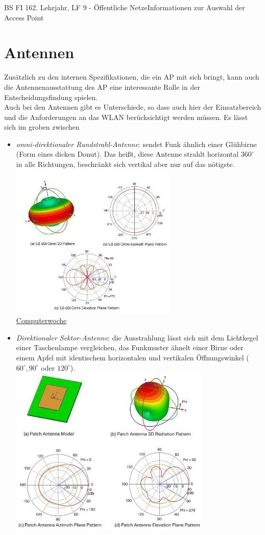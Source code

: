 \documentclass[11pt,twocolumn,oneside,openany,headings=optiontotoc,11pt,numbers=noenddot]{article}
\begin{document}
\begin{worksheet}{BS FI 16}{2. Lehrjahr, LF 9 - Öffentliche Netze}{Informationen zur Auswahl der Access Point}
		\section*{Antennen}
		Zusätzlich zu den internen Spezifikationen, die ein AP mit sich bringt, kann auch die Antennenausstattung des AP eine interessante Rolle in der Entscheidungsfindung spielen.\\
		Auch bei den Antennen gibt es Unterschiede, so dass auch hier der Einsatzbereich und die Anforderungen an das WLAN berücksichtigt werden müssen. Es lässt sich im groben zwischen
		\begin{itemize}
			\item \textit{omni-direktionaler Rundstrahl-Antenne}: sendet Funk ähnlich einer Glühbirne (Form eines dicken Donut). Das heißt, diese Antenne strahlt horizontal \(360^\circ\) in alle Richtungen, beschränkt sich vertikal aber nur auf das nötigste.\\
			\includegraphics[scale=0.75]{Bilder/omni.png}\\
			\tiny{\href{https://www.computerwoche.de/g/wlan-antennen-und-access-points-richtig-positionieren,37573,5#galleryHeadline}{Computerwoche}}\normalsize
			\item \textit{Direktionaler Sektor-Antenne}: die Ausstrahlung lässt sich mit dem Lichtkegel einer Taschenlampe vergleichen, das Funkmuster ähnelt einer Birne oder einem Apfel mit identischem horizontalen und vertikalen Öffnungswinkel (\(60^\circ, 90^\circ\) oder \(120^\circ\)).\\
			\includegraphics[scale=0.75]{Bilder/dirSek.jpg}\\

\end{itemize}
\end{worksheet}
\end{document}
